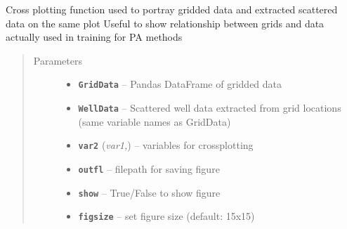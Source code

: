 \documentclass[letterpaper,10pt,english]{sphinxmanual}
\begin{document}
\begin{fulllineitems}
\label{index:pygeos.plot.fancy_xplot}
Cross plotting function used to portray gridded data and extracted scattered data on the same plot
Useful to show relationship between grids and data actually used in training for PA methods
\begin{quote}\begin{description}
\item[{Parameters}] \leavevmode\begin{itemize}
\item {} 
\textbf{\texttt{GridData}} -- Pandas DataFrame of gridded data

\item {} 
\textbf{\texttt{WellData}} -- Scattered well data extracted from grid locations (same variable names as GridData)

\item {} 
\textbf{\texttt{var2}} (\emph{var1,}) -- variables for crossplotting

\item {} 
\textbf{\texttt{outfl}} -- filepath for saving figure

\item {} 
\textbf{\texttt{show}} -- True/False to show figure

\item {} 
\textbf{\texttt{figsize}} -- set figure size (default: 15x15)

\end{itemize}

\end{description}\end{quote}

\end{fulllineitems}

\end{document}
